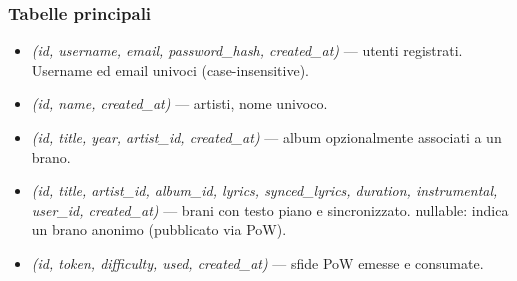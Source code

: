 \subsubsection{Tabelle principali}
\begin{itemize}
    \item {} \emph{(id, username, email, password\_hash, created\_at)} ---
    utenti registrati. Username ed email univoci (case-insensitive).
    \item {} \emph{(id, name, created\_at)} --- artisti, nome
    univoco.
    \item {} \emph{(id, title, year, artist\_id, created\_at)} ---
    album opzionalmente associati a un brano.
    \item {} \emph{(id, title, artist\_id, album\_id, lyrics,
    synced\_lyrics, duration, instrumental, user\_id, created\_at)} ---
    brani con testo piano e sincronizzato.  nullable: 
    indica un brano anonimo (pubblicato via PoW).
    \item {} \emph{(id, token, difficulty, used, created\_at)} ---
    sfide PoW emesse e consumate.
\end{itemize}
